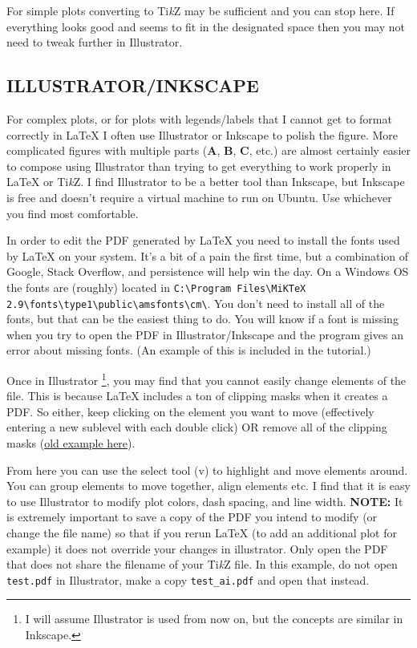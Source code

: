 \documentclass[journal,10pt]{IEEEtran}
\newcommand{\tikz}{\textup{Ti\textit{k}Z}\xspace}
\begin{document}
For simple plots converting to \tikz may be sufficient and you can stop here.
If everything looks good and seems to fit in the designated space then you may not need to tweak further in Illustrator.

\subsection{ILLUSTRATOR/INKSCAPE}

For complex plots, or for plots with legends/labels that I cannot get to format correctly in \LaTeX{} I often use Illustrator or Inkscape to polish the figure.
More complicated figures with multiple parts (\textbf{A}, \textbf{B}, \textbf{C}, etc.) are almost certainly easier to compose using Illustrator than trying to get everything to work properly in \LaTeX{} or \tikz.
I find Illustrator to be a better tool than Inkscape, but Inkscape is free and doesn't require a virtual machine to run on Ubuntu.
Use whichever you find most comfortable.

In order to edit the PDF generated by \LaTeX{} you need to install the fonts used by \LaTeX{} on your system.
It's a bit of a pain the first time, but a combination of Google, Stack Overflow, and persistence will help win the day.
On a Windows OS the fonts are (roughly) located in \texttt{C:\textbackslash Program Files\textbackslash MiKTeX 2.9\textbackslash fonts\textbackslash type1\textbackslash public\textbackslash amsfonts\textbackslash cm\textbackslash}.
You don't need to install all of the fonts, but that can be the easiest thing to do.
You will know if a font is missing when you try to open the PDF in Illustrator/Inkscape and the program gives an error about missing fonts. (An example of this is included in the tutorial.)

Once in Illustrator \footnote{I will assume Illustrator is used from now on, but the concepts are similar in Inkscape.}, you may find that you cannot easily change elements of the file.
This is because \LaTeX{} includes a ton of clipping masks when it creates a PDF.
So either, keep clicking on the element you want to move (effectively entering a new sublevel with each double click) OR remove all of the clipping masks (\href{http://support.ponoko.com/hc/en-us/articles/220289748-Please-don-t-use-clipping-masks-in-your-designs}{old example here}).

From here you can use the select tool (v) to highlight and move elements around.
You can group elements to move together, align elements etc.
I find that it is easy to use Illustrator to modify plot colors, dash spacing, and line width.
\newline
\newline
\textbf{NOTE:} It is extremely important to save a copy of the PDF you intend to modify (or change the file name) so that if you rerun \LaTeX{} (to add an additional plot for example) it does not override your changes in illustrator.
Only open the PDF that does not share the filename of your \tikz file.
In this example, do not open \texttt{test.pdf} in Illustrator, make a copy \texttt{test\_ai.pdf} and open that instead.
\end{document}
